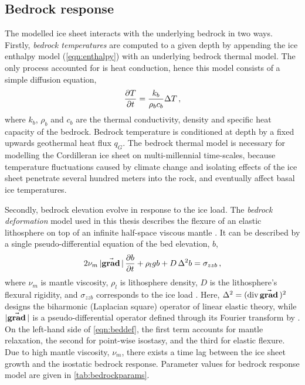 \documentclass{article}
\newcommand{\vect}[1]{\va*{#1}} %
\renewcommand{\div}[1]{\mathrm{div}\,#1}            %
\renewcommand{\grad}[1]{\vect{\mathrm{grad}}\,#1}   %
\begin{document}
\subsection{Bedrock response}

The modelled ice sheet interacts with the underlying bedrock in two ways.
Firstly, \emph{bedrock temperatures} are computed to a given depth by
appending the
ice enthalpy model (\ref{eqn:enthalpy}) with an underlying bedrock thermal
model. The only process accounted for is heat conduction, hence this model
consists of a simple diffusion equation,
\begin{equation}
    \pdv{T}{t} = \frac{k_b}{\rho_b c_b} \Delta T \,,
\end{equation}
where $k_b$, $\rho_b$ and $c_b$ are the thermal conductivity, density and
specific heat capacity of the bedrock. Bedrock temperature is conditioned at
depth by a fixed upwards geothermal heat flux $q_G$. The bedrock thermal model
is necessary for modelling the Cordilleran ice sheet on multi-millennial
time-scales, because temperature fluctuations caused by climate change and
isolating effects of the ice sheet penetrate several hundred meters into the
rock, and eventually affect basal ice temperatures.

Secondly, bedrock elevation evolve in response to the ice load. The
\emph{bedrock deformation} model used in this thesis describes the flexure of
an elastic
lithosphere on top of an infinite half-space viscous mantle
\citep{Lingle.Clark.1985}. It can be described by a single pseudo-differential
equation of the bed elevation, $b$,
\begin{equation}
    \label{eqn:beddef}
    2\nu_m\,|\grad|\,\pdv{b}{t} + \rho_l g b + D\,\Delta^2 b = \sigma_{zzb} \,,
\end{equation}
where $\nu_m$ is mantle viscosity, $\rho_l$ is lithosphere density, $D$ is the
lithosphere's flexural rigidity, and $\sigma_{zzb}$ corresponds to the ice load
\citep{Bueler.etal.2007}. Here, ${\Delta^2 = (\div\grad{})^2}$ designs the
biharmonic (Laplacian square) operator of
linear elastic theory, while $|\grad{}|$ is a pseudo-differential operator
defined through its Fourier transform by \citet[Eq.~6]{Bueler.etal.2007}. On
the left-hand side of \cref{eqn:beddef}, the first term accounts for mantle
relaxation, the second for point-wise isostasy, and the third for elastic
flexure. Due to high mantle viscosity, $\nu_m$, there exists a time lag between
the ice sheet growth and the isostatic bedrock response. Parameter values for
bedrock response model are given in \cref{tab:bedrockparams}.
\end{document}

